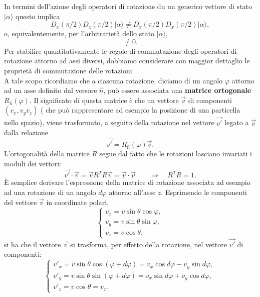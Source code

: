 \documentclass[a4paper,12pt,oneside]{book}
\begin{document}
In termini dell'azione degli operatori di rotazione du un generico vettore di stato $\vert \alpha \rangle$ questo implica
\begin{equation}
D_x (\pi/2) D_z (\pi/2) \vert \alpha \rangle \neq D_x (\pi/2) D_x (\pi/2) \vert \alpha \rangle ,
\end{equation}
o, equivalentemente, per l'arbitrarietà dello stato $\vert \alpha \rangle$,
\begin{equation}
[D_x (\pi/2); D_z (\pi/2)] \neq 0 .
\end{equation}
Per stabilire quantitativamente le regole di commutazione degli operatori di rotazione attorno ad assi diversi, dobbiamo considerare con maggior dettaglio le proprietà di commutazione delle rotazioni.\\
A tale scopo ricordiamo che a ciascuna rotazione, diciamo di un angolo $\varphi$ attorno ad un asse definito dal versore $\widehat{n}$, può essere associata una \textbf{matrice ortogonale} $R_{\widehat{n}} (\varphi)$. Il significato di questa matrice è che un vettore $\vec{v}$ di componenti $(v_x, v_y v_z) $ ( che può rappresentare ad esempio la posizione di una particella nello spazio), viene trasformato, a seguito della rotazione nel vettore $\vec{v'}$ legato a $\vec{v}$ dalla relazione
\begin{equation}
\vec{v'}= R_{\widehat{n}} (\varphi)\vec{v}.
\end{equation}
L'ortogonalità della matrice $R$ segue dal fatto che le rotazioni lasciano invariati i moduli dei vettori:
\begin{equation}
\vec{v'}\cdot\vec{v} = \vec{v}R^T R \vec{v}= \vec{v}\cdot\vec{v} \qquad \Rightarrow \quad
 R^T R =1.
\end{equation}
È semplice derivare l'espressione della matrice di rotazione associata ad esempio ad una rotazione di un angolo $d\varphi $ attorno all'asse $z$. Esprimendo le componenti del vettore $\vec{v}$ in coordinate polari,
\begin{equation}
\begin{cases}
v_x = v \sin\theta \cos \varphi ,\\
v_y = v \sin\theta \sin \varphi ,\\
v_z = v \cos\theta ,
\end{cases}
\end{equation}
si ha che il vettore $\vec{v}$ si trasforma, per effetto della rotazione, nel vettore $\vec{v'}$ di componenti:
\begin{equation}
\begin{cases}
v'_x = v \sin\theta \cos (\varphi +d\varphi )= v_x \cos d\varphi - v_y \sin d\varphi ,\\
v'_y = v \sin\theta \sin (\varphi +d\varphi ) = v_x \sin d\varphi + v_y \cos d\varphi ,\\
v'_z = v \cos\theta = v_z .
\end{cases}
\end{equation}
\end{document}
